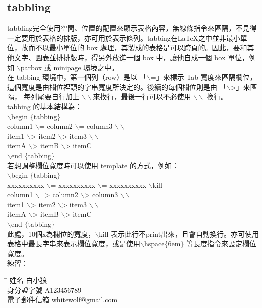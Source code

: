 \subsection{\BM tabbling}
	tabbling完全使用空間、位置的配置來顯示表格內容，無線條指令來區隔，不見得一定要用於表格的排版，亦可用於表示條列。tabbing在\LaTeX 之中並非最小單位，故而不以最小單位的 box 處理，其製成的表格是可以跨頁的。因此，要和其他文字、圖表並排排版時，得另外放進一個 box 中，讓他自成一個 box 單位，例如 $\backslash$parbox 或 minipage 環境之中。 \\
	\indent 在 tabbing 環境中，第一個列（row）是以 「$\backslash$=」來標示 Tab 寬度來區隔欄位，
這個寬度是由欄位裡頭的字串寬度所決定的。後續的每個欄位則是由 「$\backslash$>」來區隔，
每列尾要自行加上 $\backslash\backslash$來換行，最後一行可以不必使用 $\backslash\backslash$ 換行。\\
tabbing 的基本結構為： \\
$\backslash$begin $\{$tabbing$\}$ \\
column1 \;$\backslash$=  column2 \;$\backslash$= \;column3 \;$\backslash\backslash$ \\
item1 \;$\backslash$> \;item2 \;$\backslash$> \;item3 \;$\backslash\backslash$ \\
itemA \;$\backslash$> \;itemB \;$\backslash$> \;itemC \\
$\backslash$end $\{$tabbing$\}$ \\
若想調整欄位寬度時可以使用 template 的方式，例如： \\
$\backslash$begin $\{$tabbing$\}$ \\
xxxxxxxxxx \;$\backslash$=  xxxxxxxxxx \;$\backslash$= \;xxxxxxxxxx \;$\backslash$kill \\
column1 \;$\backslash$=>  column2 \;$\backslash$> \;column3 \;$\backslash\backslash$ \\
item1 \;$\backslash$> \;item2 \;$\backslash$> \;item3 \;$\backslash\backslash$ \\
itemA \;$\backslash$> \;itemB \;$\backslash$> \;itemC \\
$\backslash$end $\{$tabbing$\}$ \\
	\indent 此處，10個x為欄位的寬度，$\backslash$kill 表示此行不print出來，且會自動換行。亦可使用表格中最長字串來表示欄位寬度，或是使用$\backslash$hspace$\{$6em$\}$ 等長度指令來設定欄位寬度。\\
練習：
\begin{tabbing}
\hspace{8em} \= \hspace{6em} \kill
姓名 \> 白小狼 \\
身分證字號 \> A123456789 \\
電子郵件信箱 \> whitewolf@gmail.com  \\
\end{tabbing}

